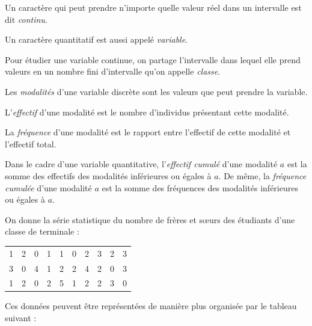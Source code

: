 \begin{defi}
\begin{description}
                              Un caract\`ere qui peut prendre n'importe quelle valeur r\'eel dans un intervalle 
                              est dit \emph{continu}.
                        \item Un caract\`ere quantitatif est aussi appel\'e \emph{variable}.
                        \item Pour \'etudier une variable continue, on partage l'intervalle dans lequel elle prend valeurs en 
                              un nombre fini d'intervalle qu'on appelle \emph{classe}.
                        \item Les \emph{modalit\'es} d'une variable discr\`ete sont les valeurs que peut prendre la variable.
                        \item L'\emph{effectif} d'une modalit\'e est le nombre d'individus pr\'esentant cette modalit\'e.
                        \item La \emph{fr\'equence} d'une modalit\'e est le 
                              rapport entre l'effectif de cette modalit\'e et l'effectif total.
                        \item Dans le cadre d'une variable quantitative, l'\emph{effectif cumul\'e}
                              d'une modalit\'e $a$ est la somme des effectifs des modalit\'es inf\'erieures ou \'egales \`a $a$.
                              De m\^eme, la \emph{fr\'equence cumul\'ee} d'une modalit\'e $a$ est la somme des fr\'equences
                              des modalit\'es inf\'erieures ou \'egales \`a $a$.
                  \end{description}
                  \begin{ex}
                        On donne la s\'erie statistique du 
                        nombre de fr\`eres et s\oe urs des \'etudiants d'une classe de terminale :
                        \begin{tabular}{cccccccccc}
                              1 & 2 & 0 & 1 & 1 & 0 & 2 & 3 & 2 & 3 \\
                              3 & 0 & 4 & 1 & 2 & 2 & 4 & 2 & 0 & 3 \\
                              1 & 2 & 0 & 2 & 5 & 1 & 2 & 2 & 3 & 0 
                        \end{tabular}
                        Ces donn\'ees peuvent \^etre repr\'esent\'ees de mani\`ere plus organis\'ee par le tableau suivant :\newline

\end{ex}
\end{defi}
